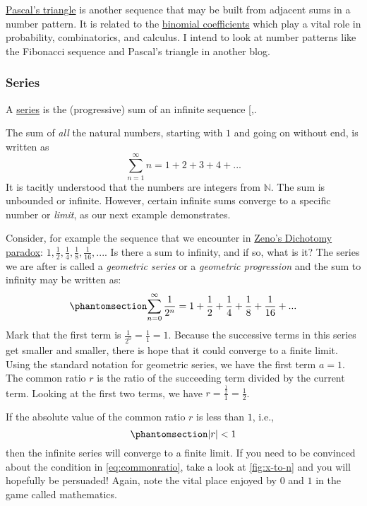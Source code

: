 \documentclass[
  a4paper,
]{article}
\begin{document}
\href{https://www.britannica.com/science/Pascals-triangle}{Pascal's
triangle} is another sequence that may be built from adjacent sums in a
number pattern. It is related to the
\href{https://en.wikipedia.org/wiki/Binomial_coefficient}{binomial
coefficients} which play a vital role in probability, combinatorics, and
calculus. I intend to look at number patterns like the Fibonacci
sequence and Pascal's triangle in another blog.

\subsubsection{Series}\label{series}

A \href{https://mathworld.wolfram.com/Series.html}{series} is the
(progressive) sum of an infinite sequence
{[},\citeproc{ref-wolframseries}{7}{]}.

The sum of \emph{all} the natural numbers, starting with \(1\) and going
on without end, is written as \[
\sum_{n = 1}^{\infty}n = 1 + 2 + 3 + 4 + ...
\] It is tacitly understood that the numbers are integers from
\(\mathbb{N}\). The sum is unbounded or infinite. However, certain
infinite sums converge to a specific number or \emph{limit}, as our next
example demonstrates.

Consider, for example the sequence that we encounter in
\href{https://en.wikipedia.org/wiki/Zeno\%27s_paradoxes}{Zeno's
Dichotomy paradox}:
\(1, \frac{1}{2}, \frac{1}{4}, \frac{1}{8}, \frac{1}{16}, ...\). Is
there a sum to infinity, and if so, what is it? The series we are after
is called a \emph{geometric series} or a \emph{geometric progression}
and the sum to infinity may be written as:
\begin{equation}\phantomsection\label{eq:dichotomy}{
\sum_{n = 0}^{\infty}\frac{1}{2^{n}} = 1 + \frac{1}{2} + \frac{1}{4} + \frac{1}{8} +
\frac{1}{16} + ...
}\end{equation} Mark that the first term is
\(\frac{1}{2^0} = \frac{1}{1} = 1\). Because the successive terms in
this series get smaller and smaller, there is hope that it could
converge to a finite limit. Using the standard notation for geometric
series, we have the first term \(a = 1\). The common ratio \(r\) is the
ratio of the succeeding term divided by the current term. Looking at the
first two terms, we have \(r = \frac{\frac{1}{2}}{1} = \frac{1}{2}\).

If the absolute value of the common ratio \(r\) is less than \(1\),
i.e.,
\begin{equation}\phantomsection\label{eq:commonratio}{\lvert{r}\rvert < 1
}\end{equation} then the infinite series will converge to a finite
limit. If you need to be convinced about the condition in
\cref{eq:commonratio}, take a look at \cref{fig:x-to-n} and you will
hopefully be persuaded! Again, note the vital place enjoyed by \(0\) and
\(1\) in the game called mathematics. \normalfont
\end{document}
